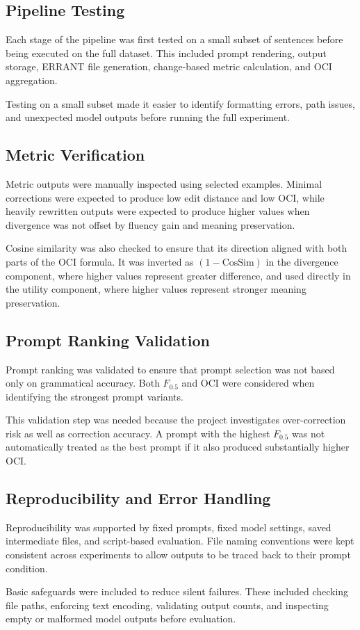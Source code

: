 \subsection{Pipeline Testing}

Each stage of the pipeline was first tested on a small subset of sentences before being executed on the full dataset. This included prompt rendering, output storage, ERRANT file generation, change-based metric calculation, and OCI aggregation.

Testing on a small subset made it easier to identify formatting errors, path issues, and unexpected model outputs before running the full experiment.

\subsection{Metric Verification}

Metric outputs were manually inspected using selected examples. Minimal corrections were expected to produce low edit distance and low OCI, while heavily rewritten outputs were expected to produce higher values when divergence was not offset by fluency gain and meaning preservation.

Cosine similarity was also checked to ensure that its direction aligned with both parts of the OCI formula. It was inverted as $(1 - \text{CosSim})$ in the divergence component, where higher values represent greater difference, and used directly in the utility component, where higher values represent stronger meaning preservation.

\subsection{Prompt Ranking Validation}

Prompt ranking was validated to ensure that prompt selection was not based only on grammatical accuracy. Both $F_{0.5}$ and OCI were considered when identifying the strongest prompt variants.

This validation step was needed because the project investigates over-correction risk as well as correction accuracy. A prompt with the highest $F_{0.5}$ was not automatically treated as the best prompt if it also produced substantially higher OCI.

\subsection{Reproducibility and Error Handling}

Reproducibility was supported by fixed prompts, fixed model settings, saved intermediate files, and script-based evaluation. File naming conventions were kept consistent across experiments to allow outputs to be traced back to their prompt condition.

Basic safeguards were included to reduce silent failures. These included checking file paths, enforcing text encoding, validating output counts, and inspecting empty or malformed model outputs before evaluation.
